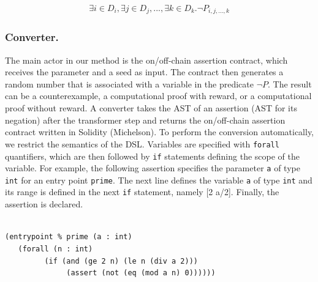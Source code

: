 \documentclass[runningheads]{llncs}
\begin{document}
\begin{gather}
  \label{eq:2}
\exists i \in D_{i},  \exists j \in D_{j},  ..., \exists k \in D_{k}. \neg P_{i, j, ...,k}
\end{gather}




\subsubsection{Converter.} The main actor in our method is the on/off-chain assertion contract, which receives the parameter and a seed as input. The contract then generates a random number that is associated with a variable in the predicate $\neg P$. The result can be a counterexample, a computational proof with reward, or a computational proof without reward. A converter takes the AST of an assertion (AST for its negation) after the transformer step and returns the on/off-chain assertion contract written in Solidity (Michelson). To perform the conversion automatically, we restrict the semantics of the DSL. Variables are specified with \texttt{forall} quantifiers, which are then followed by \texttt{if} statements defining the scope of the variable. For example, the following assertion specifies the parameter \texttt{a} of type \texttt{int} for an entry point \texttt{prime}. The next line defines the variable \texttt{a} of type \texttt{int} and its range is defined in the next \texttt{if} statement, namely [2 a/2]. Finally, the assertion is declared.

\begin{lstlisting}[numbers=none]

(entrypoint % prime (a : int)
   (forall (n : int)
         (if (and (ge 2 n) (le n (div a 2)))
              (assert (not (eq (mod a n) 0))))))
             
\end{lstlisting}
\end{document}
